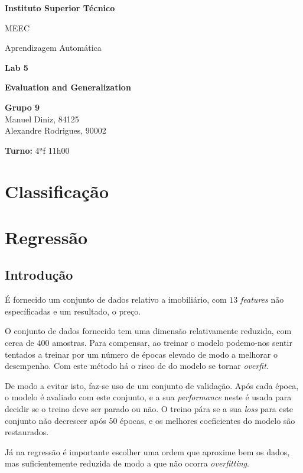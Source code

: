 \documentclass[a4paper,2pt]{report}
\begin{document}
\begin{titlepage}
    \begin{center}
        \vspace*{3cm}
 
        \LARGE
        \textbf{Instituto Superior Técnico}
        \vskip 0.4cm
 
        \Large{MEEC}
        \vskip 0.2cm

        \Large{Aprendizagem Automática}
        \vskip 3cm
        

 
        \Huge{\textbf{Lab 5}}
        \vskip 0.5cm

        \huge{\textbf{Evaluation and Generalization}}
        \vskip 0.5cm

 
        \vfill
 
        \large
        \textbf{Grupo 9}\\
        \vspace{0.3cm}
        Manuel Diniz, 84125\\
        Alexandre Rodrigues, 90002\\
        
        \vspace{1cm}

        \textbf{Turno:} 4ªf 11h00

    \end{center}
\end{titlepage}

\tableofcontents
\newpage

\chapter{Classificação}

\chapter{Regressão}
    \section{Introdução}
        \par É fornecido um conjunto de dados relativo a imobiliário, com \(13\) \textit{features} não específicadas e um resultado, o preço.
        \par O conjunto de dados fornecido tem uma dimensão relativamente reduzida, com cerca de \(400\) amostras. Para compensar, ao treinar o modelo podemo-nos sentir tentados a treinar por um número de épocas elevado de modo a melhorar o desempenho. Com este método há o risco de do modelo se tornar \textit{overfit}.
        \par De modo a evitar isto, faz-se uso de um conjunto de validação. Após cada época, o modelo é avaliado com este conjunto, e a sua \textit{performance} neste é usada para decidir se o treino deve ser parado ou não. O treino pára se a sua \textit{loss} para este conjunto não decrescer após 50 épocas, e os melhores coeficientes do modelo são restaurados.
        \par Já na regressão é importante escolher uma ordem que aproxime bem os dados, mas suficientemente reduzida de modo a que não ocorra \textit{overfitting}.
    
\end{document}
